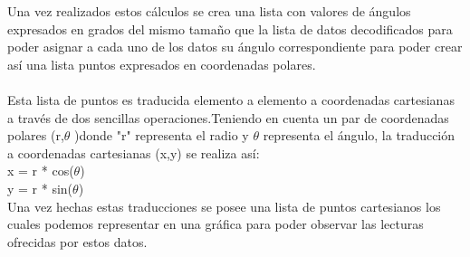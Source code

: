 Una vez realizados estos cálculos se crea una lista con valores de ángulos expresados en grados del mismo tamaño que la lista de datos decodificados para poder asignar a cada uno de los datos su ángulo correspondiente para poder crear así una lista puntos expresados en coordenadas polares.\\
\\
Esta lista de puntos es traducida elemento a elemento a coordenadas cartesianas a través de dos sencillas operaciones.Teniendo en cuenta un par de coordenadas polares (r,\(\theta\) )donde "r" representa el radio y \(\theta\)  representa el ángulo, la traducción a coordenadas cartesianas (x,y) se realiza así: \\
x = r * cos(\(\theta\))\\
y = r * sin(\(\theta\))\\
Una vez hechas estas traducciones se posee una lista de puntos cartesianos los cuales podemos representar en una gráfica para poder observar las lecturas ofrecidas por estos datos.